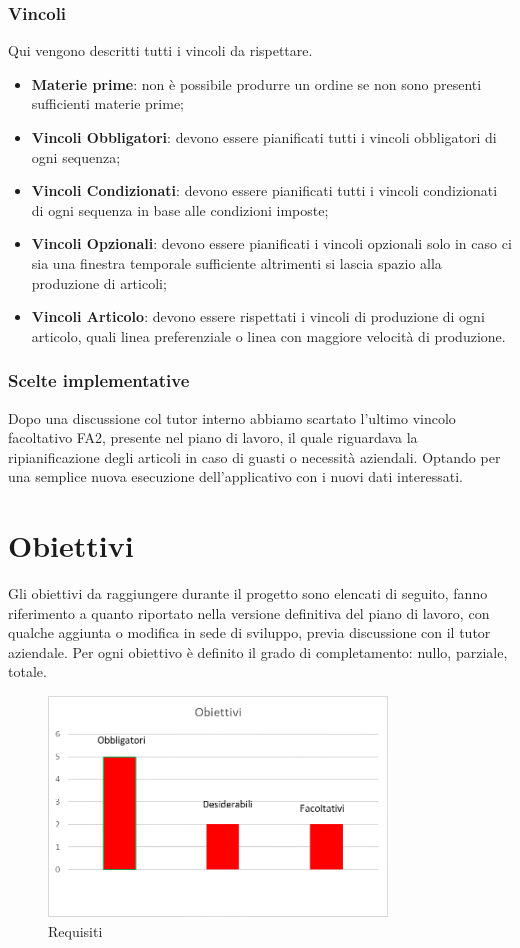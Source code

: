 \subsubsection{Vincoli}
Qui vengono descritti tutti i vincoli da rispettare.
\begin{itemize}
	
	\item \textbf{Materie prime}: non è possibile produrre un ordine se non sono presenti sufficienti materie prime;
	
	\item \textbf{Vincoli Obbligatori}: devono essere pianificati tutti i vincoli obbligatori di ogni sequenza;
	\item \textbf{Vincoli Condizionati}: devono essere pianificati tutti i vincoli condizionati di ogni sequenza in base alle condizioni imposte;
\item \textbf{Vincoli Opzionali}: devono essere pianificati i vincoli opzionali solo in caso ci sia una finestra temporale sufficiente altrimenti si lascia spazio alla produzione di articoli;
	\item \textbf{Vincoli Articolo}: devono essere rispettati i vincoli di produzione di ogni articolo, quali linea preferenziale o linea con maggiore velocità di produzione.
\end{itemize}

\subsubsection{Scelte implementative}
Dopo una discussione col tutor interno abbiamo scartato l'ultimo vincolo facoltativo FA2, presente nel piano di lavoro, il quale riguardava la ripianificazione degli articoli in caso di guasti o necessità aziendali. Optando per una semplice nuova esecuzione dell'applicativo con i nuovi dati interessati. 

\newpage
\section{Obiettivi}

Gli obiettivi da raggiungere durante il progetto sono elencati di seguito, fanno riferimento a quanto riportato nella versione definitiva del piano di lavoro, con qualche aggiunta o modifica in sede di sviluppo, previa discussione con il tutor aziendale.
Per ogni obiettivo è definito il grado di completamento: nullo, parziale, totale.

\begin{figure}[h]
	\includegraphics[width=9cm]{immagini/requisiti2.png}
	\centering
	\caption{Requisiti}
\end{figure}


